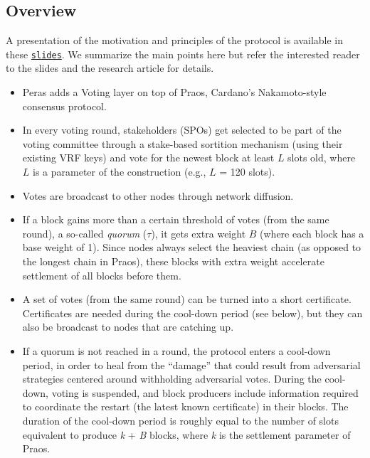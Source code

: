\documentclass[10pt]{article}
\providecommand{\tightlist}{%
  \setlength{\itemsep}{0pt}\setlength{\parskip}{0pt}}
\begin{document}
\subsection{Overview}\label{overview}

A presentation of the motivation and principles of the protocol is
available in these
\href{https://docs.google.com/presentation/d/1QGCvDoOJIWug8jJgCNv3p9BZV-R8UZCyvosgNmN-lJU/edit}{\color{blue}\texttt{slides}}.
We summarize the main points here but refer the interested reader to the
slides and the research article for details.

\begin{itemize}
\tightlist
\item
  Peras adds a Voting layer on top of Praos, Cardano's Nakamoto-style
  consensus protocol.
\item
  In every voting round, stakeholders (SPOs) get selected to be part of
  the voting committee through a stake-based sortition mechanism (using
  their existing VRF keys) and vote for the newest block at least \(L\)
  slots old, where \(L\) is a parameter of the construction (e.g., \(L\)
  = 120 slots).
\item
  Votes are broadcast to other nodes through network diffusion.
\item
  If a block gains more than a certain threshold of votes (from the same
  round), a so-called \emph{quorum} (\(\tau\)), it gets extra weight
  \(B\) (where each block has a base weight of 1). Since nodes always
  select the heaviest chain (as opposed to the longest chain in Praos),
  these blocks with extra weight accelerate settlement of all blocks
  before them.
\item
  A set of votes (from the same round) can be turned into a short
  certificate. Certificates are needed during the cool-down period (see
  below), but they can also be broadcast to nodes that are catching up.
\item
  If a quorum is not reached in a round, the protocol enters a cool-down
  period, in order to heal from the ``damage'' that could result from
  adversarial strategies centered around withholding adversarial votes.
  During the cool-down, voting is suspended, and block producers include
  information required to coordinate the restart (the latest known
  certificate) in their blocks. The duration of the cool-down period is
  roughly equal to the number of slots equivalent to produce \emph{k} +
  \emph{B} blocks, where \emph{k} is the settlement parameter of Praos.
\end{itemize}
\end{document}
